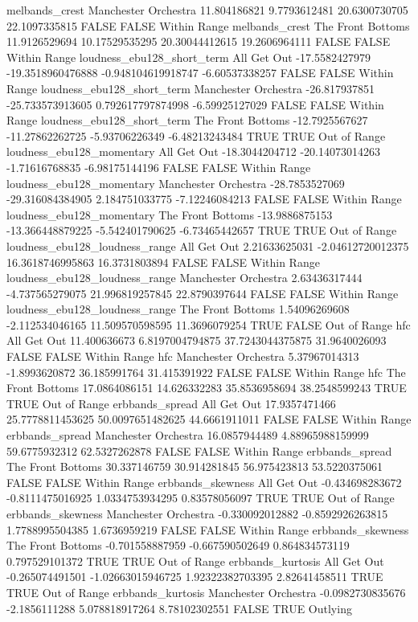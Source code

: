 melbands_crest Manchester Orchestra 11.804186821 9.7793612481 20.6300730705 22.1097335815 FALSE FALSE Within Range
melbands_crest The Front Bottoms 11.9126529694 10.17529535295 20.30044412615 19.2606964111 FALSE FALSE Within Range
loudness_ebu128_short_term All Get Out -17.5582427979 -19.3518960476888 -0.948104619918747 -6.60537338257 FALSE FALSE Within Range
loudness_ebu128_short_term Manchester Orchestra -26.817937851 -25.733573913605 0.792617797874998 -6.59925127029 FALSE FALSE Within Range
loudness_ebu128_short_term The Front Bottoms -12.7925567627 -11.27862262725 -5.93706226349 -6.48213243484 TRUE TRUE Out of Range
loudness_ebu128_momentary All Get Out -18.3044204712 -20.14073014263 -1.71616768835 -6.98175144196 FALSE FALSE Within Range
loudness_ebu128_momentary Manchester Orchestra -28.7853527069 -29.316084384905 2.184751033775 -7.12246084213 FALSE FALSE Within Range
loudness_ebu128_momentary The Front Bottoms -13.9886875153 -13.366448879225 -5.542401790625 -6.73465442657 TRUE TRUE Out of Range
loudness_ebu128_loudness_range All Get Out 2.21633625031 -2.04612720012375 16.3618746995863 16.3731803894 FALSE FALSE Within Range
loudness_ebu128_loudness_range Manchester Orchestra 2.63436317444 -4.737565279075 21.996819257845 22.8790397644 FALSE FALSE Within Range
loudness_ebu128_loudness_range The Front Bottoms 1.54096269608 -2.112534046165 11.509570598595 11.3696079254 TRUE FALSE Out of Range
hfc All Get Out 11.400636673 6.8197004794875 37.7243044375875 31.9640026093 FALSE FALSE Within Range
hfc Manchester Orchestra 5.37967014313 -1.8993620872 36.185991764 31.415391922 FALSE FALSE Within Range
hfc The Front Bottoms 17.0864086151 14.626332283 35.8536958694 38.2548599243 TRUE TRUE Out of Range
erbbands_spread All Get Out 17.9357471466 25.7778811453625 50.0097651482625 44.6661911011 FALSE FALSE Within Range
erbbands_spread Manchester Orchestra 16.0857944489 4.88965988159999 59.6775932312 62.5327262878 FALSE FALSE Within Range
erbbands_spread The Front Bottoms 30.337146759 30.914281845 56.975423813 53.5220375061 FALSE FALSE Within Range
erbbands_skewness All Get Out -0.434698283672 -0.8111475016925 1.0334753934295 0.83578056097 TRUE TRUE Out of Range
erbbands_skewness Manchester Orchestra -0.330092012882 -0.8592926263815 1.7788995504385 1.6736959219 FALSE FALSE Within Range
erbbands_skewness The Front Bottoms -0.701558887959 -0.667590502649 0.864834573119 0.797529101372 TRUE TRUE Out of Range
erbbands_kurtosis All Get Out -0.265074491501 -1.02663015946725 1.92322382703395 2.82641458511 TRUE TRUE Out of Range
erbbands_kurtosis Manchester Orchestra -0.0982730835676 -2.1856111288 5.078818917264 8.78102302551 FALSE TRUE Outlying
